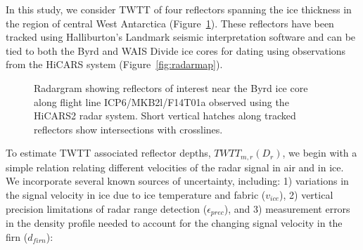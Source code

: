 In this study, we consider TWTT of four reflectors spanning the ice thickness in the region of central West Antarctica (Figure~\ref{fig:layergram}). These reflectors have been tracked using Halliburton's Landmark seismic interpretation software and can be tied to both the Byrd and WAIS Divide ice cores for dating using observations from the HiCARS system (Figure~\ref{fig:radarmap}). %

\begin{figure}[h]\label{fig:layergram}
\centering
{}
\caption{Radargram showing reflectors of interest near the Byrd ice core along flight line ICP6/MKB2l/F14T01a observed using the HiCARS2 radar system. Short vertical hatches along tracked reflectors show intersections with crosslines.}
\end{figure}


To estimate TWTT associated reflector depths, $TWTT_{m,r}(D_r)$, we begin with a simple relation relating different velocities of the radar signal in air and in ice. We incorporate several known sources of uncertainty, including: 1) variations in the signal velocity in ice due to ice temperature and fabric ($v_{ice}$), 2) vertical precision limitations of radar range detection ($\epsilon_{prec}$), and 3) measurement errors in the density profile needed to account for the changing signal velocity in the firn ($d_{firn}$):

